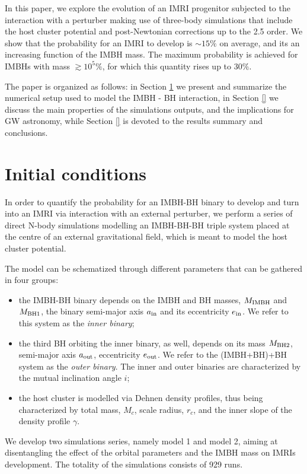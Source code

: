 \documentclass[twocolumn]{aastex62}
\newcommand{\ibh}{{\rm IMBH}}
\newcommand{\inn}{{\rm in}}
\newcommand{\out}{{\rm out}}
\newcommand{\bhu}{{\rm BH1}}
\newcommand{\bhd}{{\rm BH2}}
\begin{document}
In this paper, we explore the evolution of an IMRI progenitor subjected to the interaction with a perturber making use of three-body simulations that include the host cluster potential and post-Newtonian corrections up to the 2.5 order. We show that the probability for an IMRI to develop is $\sim 15\%$ on average, and its an increasing function of the IMBH mass. 
The maximum probability is achieved for IMBHs with mass $\gtrsim 10^5\%$, for which this quantity rises up to $30\%$.

The paper is organized as follows: in Section \ref{num} we present and summarize the numerical setup used to model the IMBH - BH interaction, in Section \ref{} we discuss the main properties of the simulations outputs, and the implications for GW astronomy, while Section \ref{} is devoted to the results summary and conclusions. 


\section{Initial conditions}
\label{num}

In order to quantify the probability for an IMBH-BH binary to develop and turn into an IMRI via interaction with an external perturber, we perform a series of direct N-body simulations modelling an IMBH-BH-BH triple system placed at the centre of an external gravitational field, which is meant to model the host cluster potential.

The model can be schematized through different parameters that can be gathered in four groups:
\begin{itemize}
\item the IMBH-BH binary depends on the IMBH and BH masses, $M_\ibh$ and $M_\bhu$, the binary semi-major axis $a_\inn$ and its eccentricity $e_\inn$. We refer to this system as the {\it inner binary};
\item the third BH orbiting the inner binary, as well, depends on its mass $M_\bhd$, semi-major axis $a_\out$, eccentricity $e_\out$. We refer to the (IMBH+BH)+BH system as the {\it outer binary}. The inner and outer binaries are characterized by the mutual inclination angle $i$;
\item the host cluster is modelled via Dehnen density profiles, thus being characterized by total mass, $M_c$, scale radius, $r_c$, and the inner slope of the density profile $\gamma$.
\end{itemize}

We develop two simulations series, namely model 1 and model 2, aiming at disentangling the effect of the orbital parameters and the IMBH mass on IMRIs development. The totality of the simulations consists of 929 runs. 
\end{document}
